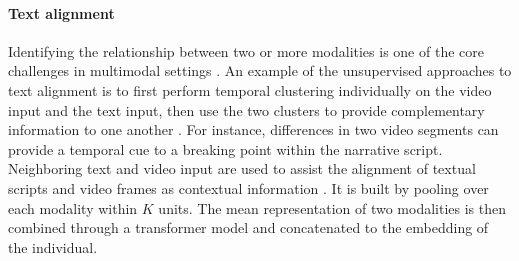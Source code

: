 
\paragraph{Text alignment}
\iffalse
Covered paper:
- Multimodal Machine Learning: A Survey and Taxonomy
- Learning Semantic Concepts and Temporal Alignment for Narrated Video Procedural Captioning
- Unsupervised Learning from Narrated Instruction Videos
- What’s Cookin’? Interpreting Cooking Videos using Text, Speech and Vision
\fi
Identifying the relationship between two or more modalities is one of the core challenges in multimodal settings \cite{MultiModalSurvey}. An example of the unsupervised approaches to text alignment is to first perform temporal clustering individually on the video input and the text input, then use the two clusters to provide complementary information to one another \cite{unsupervised-align}. For instance, differences in two video segments can provide a temporal cue to a breaking point within the narrative script. Neighboring text and video input are used to assist the alignment of textual scripts and video frames as contextual information \cite{temporalAlignShi}. It is built by pooling over each modality within $K$ units. The mean representation of two modalities is then combined through a transformer model and concatenated to the embedding of the individual. 

